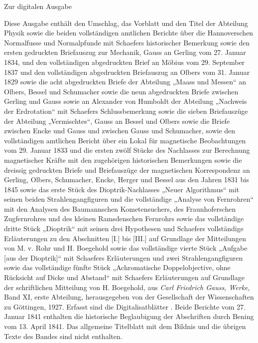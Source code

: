 \clearpage\NoSourceHead
\begin{center}\large Zur digitalen Ausgabe\end{center}
Diese Ausgabe enthält den Umschlag, das Vorblatt und den Titel der Abteilung Physik sowie die beiden vollständigen amtlichen Berichte über die Hannoverschen Normalfusse und Normalpfunde mit Schaefers historischer Bemerkung sowie den ersten gedruckten Briefauszug zur Mechanik, Gauss an Gerling vom 27. Januar 1834, und den vollständigen abgedruckten Brief an Möbius vom 29. September 1837 und den vollständigen abgedruckten Briefauszug an Olbers vom 31. Januar 1829 sowie die acht abgedruckten Briefe der Abteilung „Maass und Messen“ an Olbers, Bessel und Schumacher sowie die neun abgedruckten Briefe zwischen Gerling und Gauss sowie an Alexander von Humboldt der Abteilung „Nachweis der Erdrotation“ mit Schaefers Schlussbemerkung sowie die sieben Briefauszüge der Abteilung „Vermischtes“, Gauss an Bessel und Olbers sowie die Briefe zwischen Encke und Gauss und zwischen Gauss und Schumacher, sowie den vollständigen amtlichen Bericht über ein Lokal für magnetische Beobachtungen vom 29. Januar 1833 und die ersten zwölf Stücke des Nachlasses zur Berechnung magnetischer Kräfte mit den zugehörigen historischen Bemerkungen sowie die dreissig gedruckten Briefe und Briefauszüge der magnetischen Korrespondenz an Gerling, Olbers, Schumacher, Encke, Herger und Bessel aus den Jahren 1831 bis 1845 sowie das erste Stück des Dioptrik-Nachlasses „Neuer Algorithmus“ mit seinen beiden Strahlengangfiguren und die vollständige „Analyse von Fernrohren“ mit den Analysen des Baumannschen Kometensuchers, des Fraunhoferschen Zugfernrohres und des kleinen Ramsdenschen Fernrohrs sowie das vollständige dritte Stück „Dioptrik“ mit seinen drei Hypothesen und Schaefers vollständige Erläuterungen zu den Abschnitten [I.] bis [III.] auf Grundlage der Mitteilungen von M. v. Rohr und H. Boegehold sowie das vollständige vierte Stück „Aufgabe [aus der Dioptrik]“ mit Schaefers Erläuterungen und zwei Strahlengangfiguren sowie das vollständige fünfte Stück „Achromatische Doppelobjective, ohne Rücksicht auf Dicke und Abstand“ mit Schaefers Erläuterungen auf Grundlage der schriftlichen Mitteilung von H. Boegehold, aus \textit{Carl Friedrich Gauss, Werke}, Band XI, erste Abteilung, herausgegeben von der Gesellschaft der Wissenschaften zu Göttingen, 1927. Erfasst sind die Digitalisatblätter \SourceScope. Beide Berichte vom 27. Januar 1841 enthalten die historische Beglaubigung der Abschriften durch Bening vom 13. April 1841. Das allgemeine Titelblatt mit dem Bildnis und die übrigen Texte des Bandes sind nicht enthalten.

